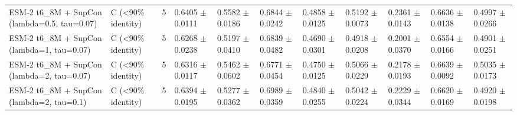 \begin{table}[ht]
\begin{tabular}{lllllllllll}
ESM-2 t6\_8M + SupCon (lambda=0.5, tau=0.07) & C (<90\% identity) & 5 & 0.6405 $\pm$ 0.0111 & 0.5582 $\pm$ 0.0186 & 0.6844 $\pm$ 0.0242 & 0.4858 $\pm$ 0.0125 & 0.5192 $\pm$ 0.0073 & 0.2361 $\pm$ 0.0143 & 0.6636 $\pm$ 0.0138 & 0.4997 $\pm$ 0.0266 \\
ESM-2 t6\_8M + SupCon (lambda=1, tau=0.07) & C (<90\% identity) & 5 & 0.6268 $\pm$ 0.0238 & 0.5197 $\pm$ 0.0410 & 0.6839 $\pm$ 0.0482 & 0.4690 $\pm$ 0.0301 & 0.4918 $\pm$ 0.0208 & 0.2001 $\pm$ 0.0370 & 0.6554 $\pm$ 0.0166 & 0.4901 $\pm$ 0.0251 \\
ESM-2 t6\_8M + SupCon (lambda=2, tau=0.07) & C (<90\% identity) & 5 & 0.6316 $\pm$ 0.0117 & 0.5462 $\pm$ 0.0602 & 0.6771 $\pm$ 0.0454 & 0.4750 $\pm$ 0.0125 & 0.5066 $\pm$ 0.0229 & 0.2178 $\pm$ 0.0193 & 0.6639 $\pm$ 0.0092 & 0.5035 $\pm$ 0.0173 \\
ESM-2 t6\_8M + SupCon (lambda=2, tau=0.1) & C (<90\% identity) & 5 & 0.6394 $\pm$ 0.0195 & 0.5277 $\pm$ 0.0362 & 0.6989 $\pm$ 0.0359 & 0.4840 $\pm$ 0.0255 & 0.5042 $\pm$ 0.0224 & 0.2229 $\pm$ 0.0344 & 0.6620 $\pm$ 0.0169 & 0.4920 $\pm$ 0.0198 \\
\hline
\end{tabular}
\end{table}
